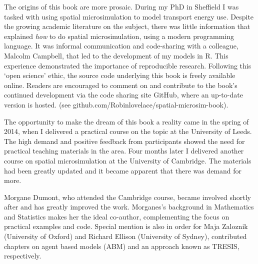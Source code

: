 The origins of this book are more prosaic. During my PhD in Sheffield
I was tasked with using spatial microsimulation to model transport energy use.
Despite the growing academic literature on the subject,
there was little information that explained \emph{how} to do spatial microsimulation,
using a modern programming language.
It was informal communication and code-sharing with a colleague,
Malcolm Campbell, that led to the development of my models in R.
This experience demonstrated the importance of
reproducible research. Following this `open science' ethic,
the source code underlying this book is freely
available online. Readers are encouraged to comment on and contribute to
the book's continued development via the code sharing site GitHub, where
an up-to-date version is hosted.
(see github.com/Robinlovelace/spatial-microsim-book).

The opportunity to make the dream of this book a reality came in the spring
of 2014, when I delivered a practical course on the topic at
the University of Leeds.
The high demand and positive feedback from participants
showed the need for practical teaching materials in the area.
Four months later
I delivered another course on spatial microsimulation
at the University of Cambridge.
The materials had been greatly updated
and it became apparent that there was demand for more.

Morgane Dumont, who attended the Cambridge course,
became involved shortly after and has greatly improved the work.
Morganes's background in Mathematics and Statistics makes her the
ideal co-author, complementing the focus on practical examples
and code. Special mention is also in order for Maja Zaloznik
(University of Oxford)
and Richard Ellison (University of Sydney),
contributed chapters on
agent based models (ABM) and an approach known as TRESIS, respectively.

